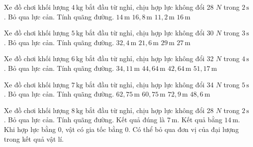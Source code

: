 \begin{ex}
Xe đồ chơi khối lượng $4\,\text{kg}$ bắt đầu từ nghỉ, chịu hợp lực không đổi 28 $N$ trong $2\,\text{s}$. Bỏ qua lực cản. Tính quãng đường.
\choice
{\True $14\,\text{m}$}
{$16,8\,\text{m}$}
{$11,2\,\text{m}$}
{$16\,\text{m}$}
\end{ex}

\begin{ex}
Xe đồ chơi khối lượng $5\,\text{kg}$ bắt đầu từ nghỉ, chịu hợp lực không đổi 30 $N$ trong $3\,\text{s}$. Bỏ qua lực cản. Tính quãng đường.
\choice
{$32,4\,\text{m}$}
{$21,6\,\text{m}$}
{$29\,\text{m}$}
{\True $27\,\text{m}$}
\end{ex}

\begin{ex}
Xe đồ chơi khối lượng $6\,\text{kg}$ bắt đầu từ nghỉ, chịu hợp lực không đổi 32 $N$ trong $4\,\text{s}$. Bỏ qua lực cản. Tính quãng đường.
\choice
{$34,11\,\text{m}$}
{$44,64\,\text{m}$}
{\True $42,64\,\text{m}$}
{$51,17\,\text{m}$}
\end{ex}

\begin{ex}
Xe đồ chơi khối lượng $7\,\text{kg}$ bắt đầu từ nghỉ, chịu hợp lực không đổi 34 $N$ trong $5\,\text{s}$. Bỏ qua lực cản. Tính quãng đường.
\choice
{$62,75\,\text{m}$}
{\True $60,75\,\text{m}$}
{$72,9\,\text{m}$}
{$48,6\,\text{m}$}
\end{ex}

\begin{ex}
Xe đồ chơi khối lượng $8\,\text{kg}$ bắt đầu từ nghỉ, chịu hợp lực không đổi 28 $N$ trong $2\,\text{s}$. Bỏ qua lực cản. Tính quãng đường.
\choiceTF
{\True Kết quả đúng là $7\,\text{m}$.}
{Kết quả bằng $14\,\text{m}$.}
{\True Khi hợp lực bằng 0, vật có gia tốc bằng 0.}
{Có thể bỏ qua đơn vị của đại lượng trong kết quả vật lí.}
\end{ex}

